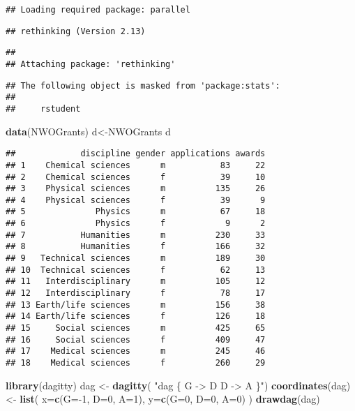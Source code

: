 \documentclass[]{article}
\newenvironment{Shaded}{\begin{snugshade}}{\end{snugshade}}
\newcommand{\KeywordTok}[1]{\textcolor[rgb]{0.13,0.29,0.53}{\textbf{{#1}}}}
\newcommand{\DataTypeTok}[1]{\textcolor[rgb]{0.13,0.29,0.53}{{#1}}}
\newcommand{\DecValTok}[1]{\textcolor[rgb]{0.00,0.00,0.81}{{#1}}}
\newcommand{\StringTok}[1]{\textcolor[rgb]{0.31,0.60,0.02}{{#1}}}
\newcommand{\NormalTok}[1]{{#1}}
\begin{document}
\begin{verbatim}
## Loading required package: parallel
\end{verbatim}

\begin{verbatim}
## rethinking (Version 2.13)
\end{verbatim}

\begin{verbatim}
## 
## Attaching package: 'rethinking'
\end{verbatim}

\begin{verbatim}
## The following object is masked from 'package:stats':
## 
##     rstudent
\end{verbatim}

\begin{Shaded}
\begin{Highlighting}[]
\KeywordTok{data}\NormalTok{(NWOGrants)}
\NormalTok{d<-NWOGrants}
\NormalTok{d}
\end{Highlighting}
\end{Shaded}

\begin{verbatim}
##             discipline gender applications awards
## 1    Chemical sciences      m           83     22
## 2    Chemical sciences      f           39     10
## 3    Physical sciences      m          135     26
## 4    Physical sciences      f           39      9
## 5              Physics      m           67     18
## 6              Physics      f            9      2
## 7           Humanities      m          230     33
## 8           Humanities      f          166     32
## 9   Technical sciences      m          189     30
## 10  Technical sciences      f           62     13
## 11   Interdisciplinary      m          105     12
## 12   Interdisciplinary      f           78     17
## 13 Earth/life sciences      m          156     38
## 14 Earth/life sciences      f          126     18
## 15     Social sciences      m          425     65
## 16     Social sciences      f          409     47
## 17    Medical sciences      m          245     46
## 18    Medical sciences      f          260     29
\end{verbatim}

\begin{Shaded}
\begin{Highlighting}[]
\KeywordTok{library}\NormalTok{(dagitty)}
\NormalTok{dag <-}\StringTok{ }\KeywordTok{dagitty}\NormalTok{( }\StringTok{"dag \{}
\StringTok{    G -> D}
\StringTok{    D -> A}
\StringTok{\}"}\NormalTok{)}
\KeywordTok{coordinates}\NormalTok{(dag) <-}\StringTok{ }\KeywordTok{list}\NormalTok{(}
    \DataTypeTok{x=}\KeywordTok{c}\NormalTok{(}\DataTypeTok{G=}\NormalTok{-}\DecValTok{1}\NormalTok{, }\DataTypeTok{D=}\DecValTok{0}\NormalTok{, }\DataTypeTok{A=}\DecValTok{1}\NormalTok{),}
    \DataTypeTok{y=}\KeywordTok{c}\NormalTok{(}\DataTypeTok{G=}\DecValTok{0}\NormalTok{, }\DataTypeTok{D=}\DecValTok{0}\NormalTok{, }\DataTypeTok{A=}\DecValTok{0}\NormalTok{)}
\NormalTok{)}
\KeywordTok{drawdag}\NormalTok{(dag)}
\end{Highlighting}
\end{Shaded}
\end{document}
